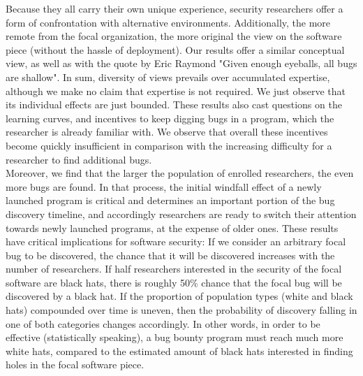 Because they all carry their own unique experience, security researchers offer a form of confrontation with alternative environments. Additionally, the more remote from the focal organization, the more original the view on the software piece (without the hassle of deployment). Our results offer a similar conceptual view, as well as with the quote by Eric Raymond "Given enough eyeballs, all bugs are shallow". In sum, diversity of views prevails over accumulated expertise, although we make no claim that expertise is not required. We just observe that its individual effects are just bounded. These results also cast questions on the learning curves, and incentives to keep digging bugs in a program, which the researcher is already familiar with. We observe that overall these incentives become quickly insufficient in comparison with the increasing difficulty for a researcher to find additional bugs.\\

Moreover, we find that the larger the population of enrolled researchers, the even more bugs are found. In that process, the initial windfall effect of a newly launched program is critical and determines an important portion of the bug discovery timeline, and accordingly researchers are ready to switch their attention towards newly launched programs, at the expense of older ones. These results have critical implications for software security: If we consider an arbitrary focal bug to be discovered, the chance that it will be discovered increases with the number of researchers. If half researchers interested in the security of the focal software are black hats, there is roughly 50\% chance that the focal bug will be discovered by a black hat. If the proportion of population types (white and black hats) compounded over time is uneven, then the probability of discovery falling in one of both categories changes accordingly. In other words, in order to be effective (statistically speaking), a bug bounty program must reach much more white hats, compared to the estimated amount of black hats interested in finding holes in the focal software piece.\\

